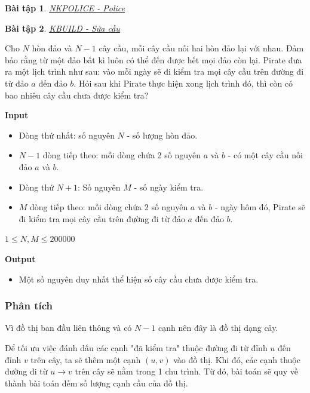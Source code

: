 \documentclass{article}
\newtheorem{baitap}{Bài tập}
\begin{document}
\begin{baitap}
    \href{https://oj.vnoi.info/problem/nkpolice}{NKPOLICE - Police}
\end{baitap}


\begin{baitap}
    \href{https://oj.vnoi.info/problem/kbuild}{KBUILD - Sửa cầu}
\end{baitap}

Cho $N$ hòn đảo và $N-1$ cây cầu, mỗi cây cầu nối hai hòn đảo lại với nhau. Đảm bảo rằng từ một đảo bất kì luôn có thể đến được hết mọi đảo còn lại. Pirate đưa ra một lịch trình như sau: vào mỗi ngày sẽ đi kiểm tra mọi cây cầu trên đường đi từ đảo $a$ đến đảo $b$. Hỏi sau khi Pirate thực hiện xong lịch trình đó, thì còn có bao nhiêu cây cầu chưa được kiểm tra?

\textbf{Input}

\begin{itemize}
    \item Dòng thứ nhất: số nguyên $N$ - số lượng hòn đảo.
    \item $N-1$ dòng tiếp theo: mỗi dòng chứa 2 số nguyên $a$ và $b$ - có một cây cầu nối đảo $a$ và $b$.
    \item Dòng thứ $N+1$: Số nguyên $M$ - số ngày kiểm tra.
    \item $M$ dòng tiếp theo: mỗi dòng chứa 2 số nguyên $a$ và $b$ - ngày hôm đó, Pirate sẽ đi kiểm tra mọi cây cầu trên đường đi từ đảo $a$ đến đảo $b$.
\end{itemize}

$1 \leq N, M \leq 200000$

\textbf{Output}

\begin{itemize}
    \item Một số nguyên duy nhất thể hiện số cây cầu chưa được kiểm tra.
\end{itemize}

\subsubsection*{Phân tích}

Vì đồ thị ban đầu liên thông và có $N-1$ cạnh nên đây là đồ thị dạng cây.

Để tối ưu việc đánh dấu các cạnh "đã kiểm tra" thuộc đường đi từ đỉnh $u$ đến đỉnh $v$ trên cây, ta sẽ thêm một cạnh $(u, v)$ vào đồ thị. Khi đó, các cạnh thuộc đường đi từ $u \rightarrow v$ trên cây sẽ nằm trong 1 chu trình. Từ đó, bài toán sẽ quy về thành bài toán đếm số lượng cạnh cầu của đồ thị.
\end{document}

